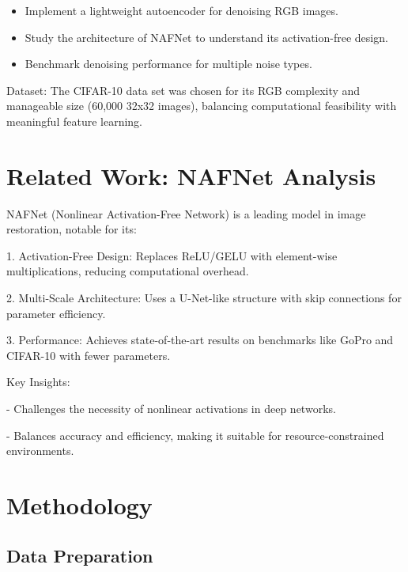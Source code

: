 \documentclass[final]{article}
\begin{document}
\begin{itemize}
    \item Implement a lightweight autoencoder for denoising RGB images.

\item Study the architecture of NAFNet to understand its activation-free design.

\item Benchmark denoising performance for multiple noise types.

\end{itemize}

Dataset: The CIFAR-10 data set was chosen for its RGB complexity and manageable size (60,000 32x32 images), balancing computational feasibility with meaningful feature learning.



\section{Related Work: NAFNet Analysis}

NAFNet (Nonlinear Activation-Free Network) is a leading model in image restoration, notable for its:

1. Activation-Free Design: Replaces ReLU/GELU with element-wise multiplications, reducing computational overhead.

2. Multi-Scale Architecture: Uses a U-Net-like structure with skip connections for parameter efficiency.

3. Performance: Achieves state-of-the-art results on benchmarks like GoPro and CIFAR-10 with fewer parameters.

Key Insights:

- Challenges the necessity of nonlinear activations in deep networks.

- Balances accuracy and efficiency, making it suitable for resource-constrained environments.




\section{Methodology}



\subsection{Data Preparation}
\end{document}
